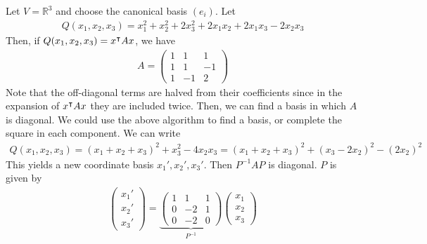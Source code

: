 \begin{example}
	Let $V = \mathbb R^3$ and choose the canonical basis $(e_i)$.
	Let
	\begin{align*}
		Q(x_1, x_2, x_3) = x_1^2 + x_2^2 + 2x_3^2 + 2x_1 x_2 + 2x_1 x_3 - 2x_2 x_3
	\end{align*}
	Then, if $Q(x_1, x_2, x_3) = x^\intercal A x$, we have
	\begin{align*}
		A = \begin{pmatrix}
			1 & 1  & 1  \\
			1 & 1  & -1 \\
			1 & -1 & 2
		\end{pmatrix}
	\end{align*}
	Note that the off-diagonal terms are halved from their coefficients since in the expansion of $x^\intercal A x$ they are included twice.
	Then, we can find a basis in which $A$ is diagonal.
	We could use the above algorithm to find a basis, or complete the square in each component.
	We can write
	\begin{align*}
		Q(x_1, x_2, x_3) = (x_1 + x_2 + x_3)^2 + x_3^2 - 4 x_2 x_3 = (x_1 + x_2 + x_3)^2 + (x_3 - 2x_2)^2 - (2x_2)^2
	\end{align*}
	This yields a new coordinate basis $x_1', x_2', x_3'$.
	Then $P^{-1} A P$ is diagonal.
	$P$ is given by
	\begin{align*}
		\begin{pmatrix} x_1' \\ x_2' \\ x_3' \end{pmatrix} = \underbrace{\begin{pmatrix} 1 & 1 & 1 \\ 0 & -2 & 1 \\ 0 & -2 & 0 \end{pmatrix}}_{P^{-1}} \begin{pmatrix} x_1 \\ x_2 \\ x_3 \end{pmatrix}
	\end{align*}
\end{example}

